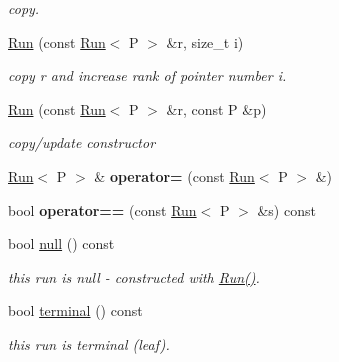 \begin{DoxyCompactItemize}
\begin{DoxyCompactList}\small\item\em copy. \end{DoxyCompactList}\item 
\mbox{\hyperlink{classRun_ae14a444c0e91801d76f5138a36da435d}{Run}} (const \mbox{\hyperlink{classRun}{Run}}$<$ P $>$ \&r, size\+\_\+t i)
\begin{DoxyCompactList}\small\item\em copy r and increase rank of pointer number i. \end{DoxyCompactList}\item 
\mbox{\hyperlink{classRun_aa0d15ec06ce84a5db17c26922f708d44}{Run}} (const \mbox{\hyperlink{classRun}{Run}}$<$ P $>$ \&r, const P \&p)
\begin{DoxyCompactList}\small\item\em copy/update constructor \end{DoxyCompactList}\item 
\mbox{\label{classRun_a89b0d51eafbc4c34a92f2eca0d8e77f8}} 
\mbox{\hyperlink{classRun}{Run}}$<$ P $>$ \& {\bfseries operator=} (const \mbox{\hyperlink{classRun}{Run}}$<$ P $>$ \&)
\item 
\mbox{\label{classRun_a47f62430b7446078aa94dcbb45e86dfc}} 
bool {\bfseries operator==} (const \mbox{\hyperlink{classRun}{Run}}$<$ P $>$ \&s) const
\item 
\mbox{\label{classRun_a5efb56b2aaad574a21e42aeb6a7b5742}} 
bool \mbox{\hyperlink{classRun_a5efb56b2aaad574a21e42aeb6a7b5742}{null}} () const
\begin{DoxyCompactList}\small\item\em this run is null -\/ constructed with \mbox{\hyperlink{classRun_ae8145f85e985d5ff3aa118bd99901675}{Run()}}. \end{DoxyCompactList}\item 
\mbox{\label{classRun_a69d622e31bcd4e6f07c43efc0e788481}} 
bool \mbox{\hyperlink{classRun_a69d622e31bcd4e6f07c43efc0e788481}{terminal}} () const
\begin{DoxyCompactList}\small\item\em this run is terminal (leaf). \end{DoxyCompactList}\item 
\mbox{\label{classRun_a006c247eb8839a9a5045e53917e984c6}} 

\end{DoxyCompactItemize}
